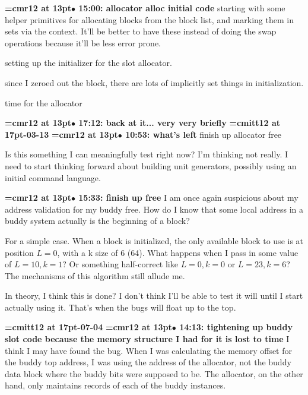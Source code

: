 {\smallskip\noindent\bf\font\titlefont=cmr12 at 13pt\titlefont $\bullet$ 15:00: allocator alloc initial code}\smallskip
starting with some helper primitives for allocating blocks from the block list, and marking them in sets via the context. It'll be better to have these instead of doing the swap operations because it'll be less error prone.
\par

setting up the initializer for the slot allocator.
\par

since I zeroed out the block, there are lots of implicitly set things in initialization.
\par

time for the allocator
\par

{\smallskip\noindent\bf\font\titlefont=cmr12 at 13pt\titlefont $\bullet$ 17:12: back at it... very very briefly}\smallskip
{\medskip\noindent\bf\font\titlefont=cmitt12 at 17pt-03-13}\medskip
{\smallskip\noindent\bf\font\titlefont=cmr12 at 13pt\titlefont $\bullet$ 10:53: what's left}\smallskip
finish up allocator free
\par

Is this something I can meaningfully test right now? I'm thinking not really. I need to start thinking forward about building unit generators, possibly using an initial command language.
\par

{\smallskip\noindent\bf\font\titlefont=cmr12 at 13pt\titlefont $\bullet$ 15:33: finish up free}\smallskip
I am once again suspicious about my address validation for my buddy free. How do I know that some local address in a buddy system actually is the beginning of a block?
\par

For a simple case. When a block is initialized, the only available block to use is at position $L = 0$, with a k size of 6 (64). What happens when I pass in some value of $L = 10, k = 1$? Or something half-correct like $L=0, k=0$ or $L=23, k=6$? The mechanisms of this algorithm still allude me.
\par

In theory, I think this is done? I don't think I'll be able to test it will until I start actually using it. That's when the bugs will float up to the top.
\par

{\medskip\noindent\bf\font\titlefont=cmitt12 at 17pt-07-04}\medskip
{\smallskip\noindent\bf\font\titlefont=cmr12 at 13pt\titlefont $\bullet$ 14:13: tightening up buddy slot code because the memory structure I had for it is lost to time}\smallskip
I think I may have found the bug. When I was calculating the memory offset for the buddy top address, I was using the address of the allocator, not the buddy data block where the buddy bits were supposed to be. The allocator, on the other hand, only maintains records of each of the buddy instances.
\par

